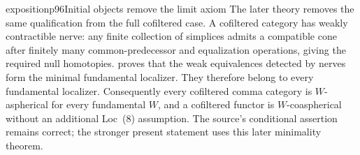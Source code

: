 \begin{dcomment}{exposition}{p96}{Initial objects remove the limit axiom}
The later theory removes the same qualification from the full cofiltered case. A cofiltered category has weakly contractible nerve: any finite collection of simplices admits a compatible cone after finitely many common-predecessor and equalization operations, giving the required null homotopies. \citet[Theorem 2.2.11, p.~136]{Cisinski2004Minimal} proves that the weak equivalences detected by nerves form the minimal fundamental localizer. They therefore belong to every fundamental localizer. Consequently every cofiltered comma category is $W$-aspherical for every fundamental $W$, and a cofiltered functor is $W$-coaspherical without an additional Loc~(8) assumption. The source's conditional assertion remains correct; the stronger present statement uses this later minimality theorem.
\end{dcomment}


